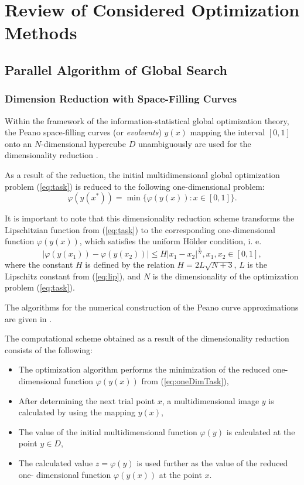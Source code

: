 \documentclass{svproc}
\begin{document}
\section{Review of Considered Optimization Methods}

\subsection{Parallel Algorithm of Global Search}
\subsubsection{Dimension Reduction with Space-Filling Curves}
Within the framework of the information-statistical global optimization theory,
the Peano space-filling curves (or \textit{evolvents}) \(y(x)\) mapping the interval \([0,1]\)
onto an \(N\)-dimensional hypercube \(D\) unambiguously are used for the dimensionality
reduction \cite{sergeyevStronginLera2013, strongin1978, strSergGO}.
\par
As a result of the reduction, the initial multidimensional global optimization
problem (\ref{eq:task}) is reduced to the following one-dimensional problem:
\begin{equation}
\label{eq:oneDimTask}
\varphi(y(x^*))=\min\{\varphi(y(x)):x\in [0,1]\}.
\end{equation}
\par
It is important to note that this dimensionality reduction scheme transforms the %
Lipschitzian function from (\ref{eq:task}) to the corresponding one-dimensional
function \(\varphi(y(x))\), which satisfies the uniform H{\"o}lder condition, i. e.
\begin{equation}
\label{eq:holder}
|\varphi(y(x_1))-\varphi(y(x_2))|\leq H{|x_1-x_2|}^{\frac{1}{N}}, x_1,x_2\in[0,1],
\end{equation}
where the constant $H$ is defined by the relation \(H=2L\sqrt{N+3}\), \(L\) is the Lipschitz
constant from (\ref{eq:lip}), and \(N\) is the dimensionality of the optimization problem
(\ref{eq:task}).
\par
The algorithms for the numerical construction of the Peano curve approximations are
given in \cite{strSergGO}.

\par
The computational scheme obtained as a result of the dimensionality reduction consists of the
following:
\begin{itemize}
  \item The optimization algorithm performs the minimization of the reduced one-dimensional
  function \(\varphi(y(x))\) from (\ref{eq:oneDimTask}),
  \item After determining the next trial point \(x\), a multidimensional image \(y\) is calculated by
using the mapping \(y(x)\),
  \item The value of the initial multidimensional function \(\varphi(y)\) is calculated at the point
\(y\in D\),
  \item The calculated value \(z=\varphi(y)\) is used further as the value of the reduced one-
dimensional function \(\varphi(y(x))\) at the point \(x\).
\end{itemize}
\end{document}
